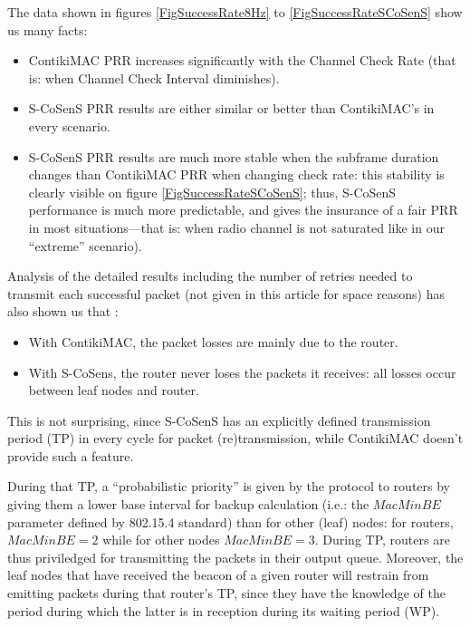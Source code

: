 \documentclass[conference]{IEEEtran}
\begin{document}
The data shown in figures \ref{FigSuccessRate8Hz} to
\ref{FigSuccessRateSCoSenS} show us many facts:

\begin{itemize}

\item ContikiMAC PRR increases significantly with the Channel Check Rate
      (that is: when Channel Check Interval diminishes).

\item S-CoSenS PRR results are either similar or better than ContikiMAC's
      in every scenario.

\item S-CoSenS PRR results are much more stable when the subframe duration
      changes than ContikiMAC PRR when changing check rate: this stability
      is clearly visible on figure \ref{FigSuccessRateSCoSenS}; thus,
      S-CoSenS performance is much more predictable, and gives
      the insurance of a fair PRR in most situations---that is:
      when radio channel is not saturated like in our ``extreme''
      scenario).

\end{itemize}

Analysis of the detailed results including the number of retries needed
to transmit each successful packet (not given in this article for space
reasons) has also shown us that :

\begin{itemize}

\item With ContikiMAC, the packet losses are mainly due to the router.

\item With S-CoSens, the router never loses the packets it receives:
      all losses occur between leaf nodes and router.

\end{itemize}

This is not surprising, since S-CoSenS has an explicitly defined transmission
period (TP) in every cycle for packet (re)transmission, while ContikiMAC
doesn't provide such a feature.

During that TP, a ``probabilistic priority'' is given by the protocol to
routers by giving them a lower base interval for backup calculation
(i.e.: the $MacMinBE$ parameter defined by 802.15.4 standard) than
for other (leaf) nodes: for routers, $MacMinBE = 2$ while for
other nodes $MacMinBE = 3$. During TP, routers are thus priviledged
for transmitting the packets in their output queue. Moreover,
the leaf nodes that have received the beacon of a given router
will restrain from emitting packets during that router's TP,
since they have the knowledge of the period during which
the latter is in reception during its waiting period (WP).
\end{document}
